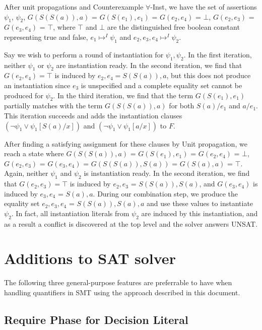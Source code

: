 \documentclass{llncs}
\begin{document}
After unit propagations and Counterexample $\forall$-Inst, we have the set of assertions $\psi_1$, $\psi_2$, $G( S(S(a)), a)$ = $G( S(e_1), e_1)$ = $G( e_2, e_4 )$ = $\bot$, $G( e_2, e_3 )$ = $G( e_3, e_4 )$ = $\top$, where $\top$ and $\bot$ are the distinguished free boolean constant representing true and false, $e_1 \mapsto^I \psi_1$ and $e_2, e_3, e_4 \mapsto^I \psi_2$.

Say we wish to perform a round of instantiation for $\psi_1, \psi_2$.
In the first iteration, neither $\psi_1$ or $\psi_2$ are instantiation ready.
In the second iteration, we find that $G( e_2, e_4 ) = \top$ is induced by $e_2, e_4 = S(S(a)), a$, but this does not produce an instantiation since $e_3$ is unspecified and a complete equality set cannot be produced for $\psi_2$.
In the third iteration, we find that the term $G( S(e_1), e_1)$ partially matches with the term $G( S(S(a)), a)$ for both $S(a)/e_1$ and $a/e_1$.
This iteration succeeds and adds the instantiation clauses $( \neg \psi_1 \vee \psi_1[S(a)/x])$ and $( \neg \psi_1 \vee \psi_1[a/x])$ to $F$.

After finding a satisfying assignment for these clauses by Unit propagation, we reach a state where $G( S(S(a)), a)$ = $G( S(e_1), e_1)$ = $G( e_2, e_4 )$ = $\bot$, $G( e_2, e_3 )$ = $G( e_3, e_4 )$ = $G(S(S(a)), S(a))$ = $G( S(a), a)$ = $\top$.
Again, neither $\psi_1$ and $\psi_2$ is instantiation ready.
In the second iteration, we find that $G( e_2, e_3 ) = \top$ is induced by $e_2,e_3$ = $S(S(a)), S(a)$, and $G( e_3, e_4 )$ is induced by $e_3, e_4$ = $S(a), a$.
During our combination step, we produce the equality set $e_2, e_3, e_4$ = $S(S(a)), S(a), a$ and use these values to instantiate $\psi_2$.
In fact, all instantiation literals from $\psi_2$ are induced by this instantiation, and as a result a conflict is discovered at the top level and the solver answers UNSAT.

\section{Additions to SAT solver}
\label{sec:sat-add}

The following three general-purpose features are preferrable to have when handling quantifiers in SMT using the approach described in this document.

\subsection{Require Phase for Decision Literal}
\end{document}
